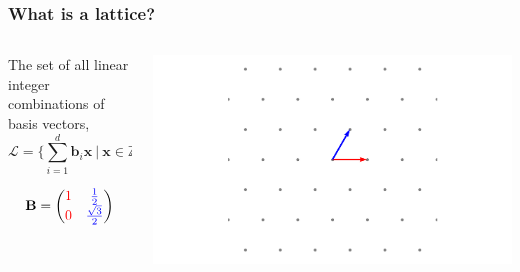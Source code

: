 \documentclass[
aspectratio=169, %
t, %
onlytextwidth, %
10pt, %
]{beamer}
\begin{document}
\begin{frame}
    \frametitle{What is a lattice?}
    \begin{columns}[T]
        \begin{column}{0.48\linewidth}
            \begin{center}
            \begin{tcolorbox}[colback=ICLBlue!5!white,colframe=ICLBlue,title=\textbf{Definition:} Lattice]
                The set of all linear integer combinations of basis vectors,
                \[
                    \mathcal{L} = \{ \sum_{i = 1}^{d}\mathbf{b}_i\mathbf{x} \ | \ \mathbf{x} \in \mathbb{Z}^d \}
                \]
            \end{tcolorbox}

            \[
                \mathbf{B} = \begin{pmatrix}
                    \color{red}1 & \color{blue}\frac{1}{2}\\
                    \color{red}0 & \color{blue}\frac{\sqrt{3}}{2}
                \end{pmatrix}
            \]
            \end{center}
        \end{column}
        \begin{column}{0.48\linewidth}
            \includegraphics[width=\linewidth]{a2_good_basis.png}
        \end{column}
    \end{columns}
\end{frame}

\end{document}
